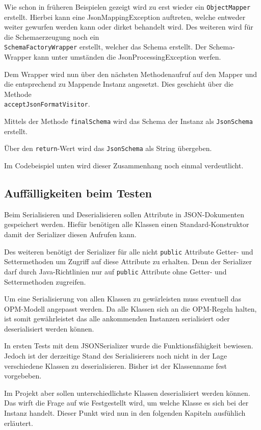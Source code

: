 Wie schon in fr\"uheren Beispielen gezeigt wird zu erst wieder ein \texttt{ObjectMapper} erstellt. Hierbei kann eine JsonMappingException auftreten, welche entweder weiter gewurfen werden kann oder dirket behandelt wird.
Des weiteren wird f\"ur die Schemaerzeugung noch ein \\\texttt{SchemaFactoryWrapper} erstellt, welcher das Schema erstellt.
Der Schema-Wrapper kann unter umst\"anden die JsonProcessingException werfen.

Dem Wrapper wird nun \"uber den n\"achsten Methodenaufruf auf den Mapper und die entsprechend zu Mappende Instanz angesetzt. Dies geschieht \"uber die Methode \\\texttt{acceptJsonFormatVisitor}.

Mittels der Methode \texttt{finalSchema} wird das Schema der Instanz als \texttt{JsonSchema} erstellt.

\"Uber den \texttt{return}-Wert wird das \texttt{JsonSchema} als String \"ubergeben.

Im Codebeispiel unten wird dieser Zusammenhang noch einmal verdeutlicht.



\subsection{Auff\"alligkeiten beim Testen}
Beim Serialisieren und Deserialisieren sollen Attribute in JSON-Dokumenten gespeichert werden. Hief\"ur ben\"otigen alle Klassen einen Standard-Konstruktor damit der Serializer diesen Aufrufen kann. 

Des weiteren ben\"otigt der Serializer f\"ur alle nicht \texttt{public} Attribute Getter- und Settermethoden um Zugriff auf diese Attribute zu erhalten. Denn der Serializer darf durch Java-Richtlinien nur auf \texttt{public} Attribute ohne Getter- und Settermethoden zugreifen.

Um eine Serialisierung von allen Klassen zu gew\"arleisten muss eventuell das OPM-Modell angepasst werden.
Da alle Klassen sich an die OPM-Regeln halten, ist somit gew\"ahrleistet das alle ankommenden Instanzen serialisiert oder deserialisiert werden k\"onnen.

In ersten Tests mit dem JSONSerializer wurde die Funktionsf\"ahigkeit bewiesen. Jedoch ist der derzeitige Stand des Serialisierers noch nicht in der Lage verschiedene Klassen zu deserialisieren. Bisher ist der Klassenname fest vorgebeben.

Im Projekt aber sollen unterschiedlichste Klassen deserialisiert werden k\"onnen. Das wirft die Frage auf wie Festgestellt wird, um welche Klasse es sich bei der Instanz handelt. Dieser Punkt wird nun in den folgenden Kapiteln ausf\"uhlich erl\"autert.

